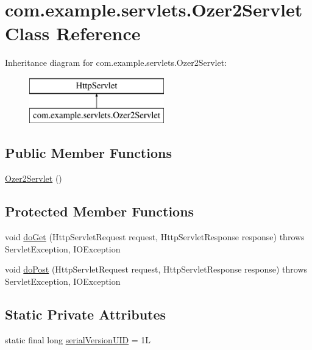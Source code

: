 \hypertarget{classcom_1_1example_1_1servlets_1_1_ozer2_servlet}{}\section{com.\+example.\+servlets.\+Ozer2\+Servlet Class Reference}
\label{classcom_1_1example_1_1servlets_1_1_ozer2_servlet}
Inheritance diagram for com.\+example.\+servlets.\+Ozer2\+Servlet\+:\begin{figure}[H]
\begin{center}
\leavevmode
\includegraphics[height=2.000000cm]{classcom_1_1example_1_1servlets_1_1_ozer2_servlet}
\end{center}
\end{figure}
\subsection*{Public Member Functions}
\begin{DoxyCompactItemize}
\item 
\hyperlink{classcom_1_1example_1_1servlets_1_1_ozer2_servlet_a06251df51ea525cfedf5dec488ad58f2}{Ozer2\+Servlet} ()
\end{DoxyCompactItemize}
\subsection*{Protected Member Functions}
\begin{DoxyCompactItemize}
\item 
void \hyperlink{classcom_1_1example_1_1servlets_1_1_ozer2_servlet_af9ddf218ed38e3372658be9ebfbdde64}{do\+Get} (Http\+Servlet\+Request request, Http\+Servlet\+Response response)  throws Servlet\+Exception, I\+O\+Exception 
\item 
void \hyperlink{classcom_1_1example_1_1servlets_1_1_ozer2_servlet_a3dc6ef2c0365fad91e8ebb6b9106551a}{do\+Post} (Http\+Servlet\+Request request, Http\+Servlet\+Response response)  throws Servlet\+Exception, I\+O\+Exception 
\end{DoxyCompactItemize}
\subsection*{Static Private Attributes}
\begin{DoxyCompactItemize}
\item 
static final long \hyperlink{classcom_1_1example_1_1servlets_1_1_ozer2_servlet_adda557e8b6e5941a32e2aa6a66ad1295}{serial\+Version\+U\+ID} = 1L
\end{DoxyCompactItemize}


